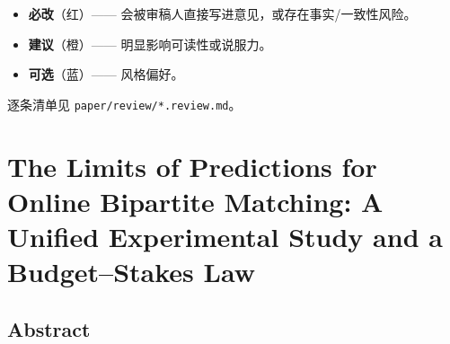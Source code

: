\begin{itemize}
\tightlist
\item
  \textbf{必改}（红）------
  会被审稿人直接写进意见，或存在事实/一致性风险。
\item
  \textbf{建议}（橙）------ 明显影响可读性或说服力。
\item
  \textbf{可选}（蓝）------ 风格偏好。
\end{itemize}

逐条清单见 \texttt{paper/review/*.review.md}。

\clearpage

\chapter{The Limits of Predictions for Online Bipartite Matching: A
Unified Experimental Study and a Budget--Stakes
Law}\label{the-limits-of-predictions-for-online-bipartite-matching-a-unified-experimental-study-and-a-budgetstakes-law}

\section{Abstract}\label{abstract}

